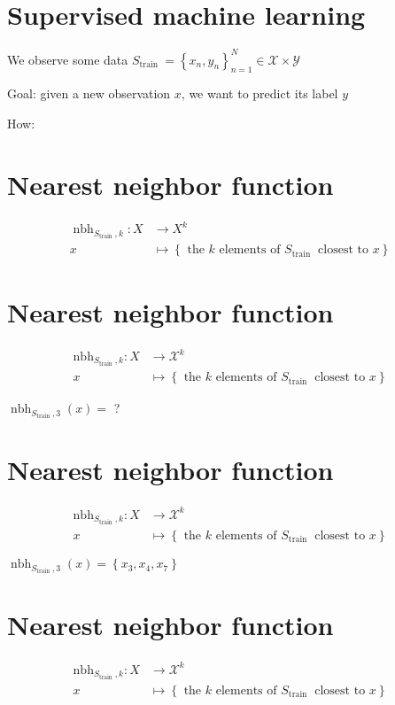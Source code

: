 
\section*{Supervised machine learning}
We observe some data $S_{\text {train }}=\left\{x_{n}, y_{n}\right\}_{n=1}^{N} \in \mathscr{X} \times \mathscr{Y}$

Goal: given a new observation $x$, we want to predict its label $y$

How:


\section*{Nearest neighbor function}
$$
\begin{aligned}
\operatorname{nbh}_{S_{\text {train }}, k}: X & \rightarrow X^{k} \\
x & \mapsto\left\{\text { the } k \text { elements of } S_{\text {train }} \text { closest to } x\right\}
\end{aligned}
$$


\section*{Nearest neighbor function}
$$
\begin{aligned}
\mathrm{nbh}_{S_{\text {train }}, k}: X & \rightarrow \mathscr{X}^{k} \\
x & \mapsto\left\{\text { the } k \text { elements of } S_{\text {train }} \text { closest to } x\right\}
\end{aligned}
$$


$\operatorname{nbh}_{S_{\text {train }}, 3}(x)=$ ?

\section*{Nearest neighbor function}
$$
\begin{aligned}
\mathrm{nbh}_{S_{\text {train }}, k}: X & \rightarrow \mathscr{X}^{k} \\
x & \mapsto\left\{\text { the } k \text { elements of } S_{\text {train }} \text { closest to } x\right\}
\end{aligned}
$$


$\operatorname{nbh}_{S_{\text {train }}, 3}(x)=\left\{x_{3}, x_{4}, x_{7}\right\}$

\section*{Nearest neighbor function}
$$
\begin{aligned}
\mathrm{nbh}_{S_{\text {train }}, k}: X & \rightarrow \mathscr{X}^{k} \\
x & \mapsto\left\{\text { the } k \text { elements of } S_{\text {train }} \text { closest to } x\right\}
\end{aligned}
$$


